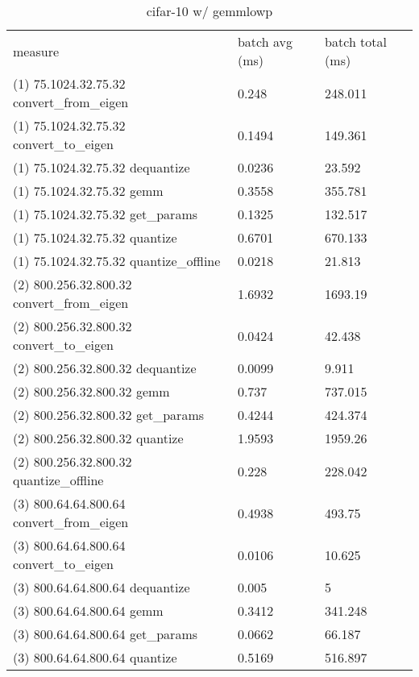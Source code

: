 \begin{longtable}{lll}
\caption{cifar-10 w/ gemmlowp}\\
measure                                    & batch avg (ms) & batch total (ms) \\
(1) 75.1024.32.75.32 convert\_from\_eigen  & 0.248          & 248.011          \\
(1) 75.1024.32.75.32 convert\_to\_eigen    & 0.1494         & 149.361          \\
(1) 75.1024.32.75.32 dequantize            & 0.0236         & 23.592           \\
(1) 75.1024.32.75.32 gemm                  & 0.3558         & 355.781          \\
(1) 75.1024.32.75.32 get\_params           & 0.1325         & 132.517          \\
(1) 75.1024.32.75.32 quantize              & 0.6701         & 670.133          \\
(1) 75.1024.32.75.32 quantize\_offline     & 0.0218         & 21.813           \\
(2) 800.256.32.800.32 convert\_from\_eigen & 1.6932         & 1693.19          \\
(2) 800.256.32.800.32 convert\_to\_eigen   & 0.0424         & 42.438           \\
(2) 800.256.32.800.32 dequantize           & 0.0099         & 9.911            \\
(2) 800.256.32.800.32 gemm                 & 0.737          & 737.015          \\
(2) 800.256.32.800.32 get\_params          & 0.4244         & 424.374          \\
(2) 800.256.32.800.32 quantize             & 1.9593         & 1959.26          \\
(2) 800.256.32.800.32 quantize\_offline    & 0.228          & 228.042          \\
(3) 800.64.64.800.64 convert\_from\_eigen  & 0.4938         & 493.75           \\
(3) 800.64.64.800.64 convert\_to\_eigen    & 0.0106         & 10.625           \\
(3) 800.64.64.800.64 dequantize            & 0.005          & 5                \\
(3) 800.64.64.800.64 gemm                  & 0.3412         & 341.248          \\
(3) 800.64.64.800.64 get\_params           & 0.0662         & 66.187           \\
(3) 800.64.64.800.64 quantize              & 0.5169         & 516.897          \\

\end{longtable}
